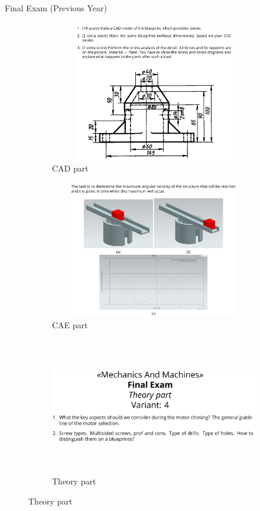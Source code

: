 \documentclass[aspectratio=169]{beamer}
\begin{document}
\begin{frame}[t]{Final Exam (Previous Year)}
    \framesubtitle{}
        \begin{figure}[H]
            \begin{subfigure}{0.32\textwidth}
                \centering\includegraphics[height=6cm,width=1\textwidth,keepaspectratio]{resources/ex1.png}
                \caption*{CAD part}
                \label{fig:resources/ex1.png}
            \end{subfigure}
            \begin{subfigure}{0.32\textwidth}
                \centering\includegraphics[height=6cm,width=1\textwidth,keepaspectratio]{resources/ex2.png}
                \caption*{CAE part}
                \label{fig:resources/ex2.png}
            \end{subfigure}
            \begin{subfigure}{0.32\textwidth}
                \centering\includegraphics[height=6cm,width=1\textwidth,keepaspectratio]{resources/ex3.png}
                \caption*{Theory part}
                \label{fig:resources/ex3.png}
            \end{subfigure}
        \end{figure}
    \end{frame}
\end{document}
